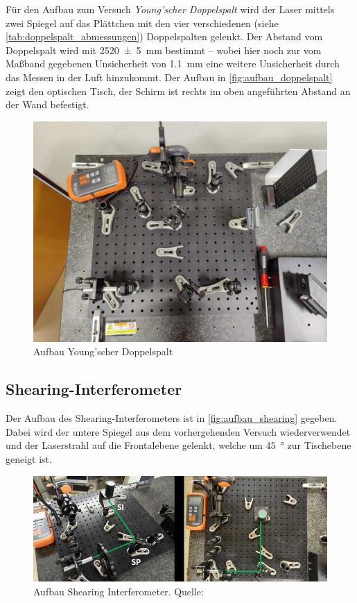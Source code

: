 \documentclass[ngerman]{scrartcl}
\begin{document}
Für den Aufbau zum Versuch \textit{Young'scher Doppelspalt} wird der Laser mittels zwei Spiegel auf das Plättchen mit den vier verschiedenen (siehe \autoref{tab:doppelspalt_abmessungen}) Doppelspalten gelenkt. Der Abstand vom Doppelspalt wird mit \SI{2520(5)}{\milli\meter} bestimmt -- wobei hier noch zur vom Maßband gegebenen Unsicherheit von \SI{1.1}{\milli\meter} eine weitere Unsicherheit durch das Messen in der Luft hinzukommt. Der Aufbau in \autoref{fig:aufbau_doppelspalt} zeigt den optischen Tisch, der Schirm ist rechts im oben angeführten Abstand an der Wand befestigt.
\begin{figure}[H]
    \centering
    \begin{samepage}
        \includegraphics[width=0.7\linewidth]{fig/Compressed/aufbau_doppelspalt.jpg}
        \caption{Aufbau Young'scher Doppelspalt}
        \label{fig:aufbau_doppelspalt}
    \end{samepage}
\end{figure}


\subsection{Shearing-Interferometer}
\label{sec:aufbau_shearing}

Der Aufbau des Shearing-Interferometers ist in \autoref{fig:aufbau_shearing} gegeben. Dabei wird der untere Spiegel aus dem vorhergehenden Versuch wiederverwendet und der Laserstrahl auf die Frontalebene gelenkt, welche um \SI{45}{\degree} zur Tischebene geneigt ist.
%
\begin{figure}[H]
    \centering
    \begin{samepage}
        \includegraphics[width=0.9\linewidth]{fig/Compressed/shearing.jpg}
        \caption[Aufbau Shearing Interferometer]{Aufbau Shearing Interferometer. Quelle: \cite{ref:angabe}}
        \label{fig:aufbau_shearing}
    \end{samepage}
\end{figure}
%
\end{document}
